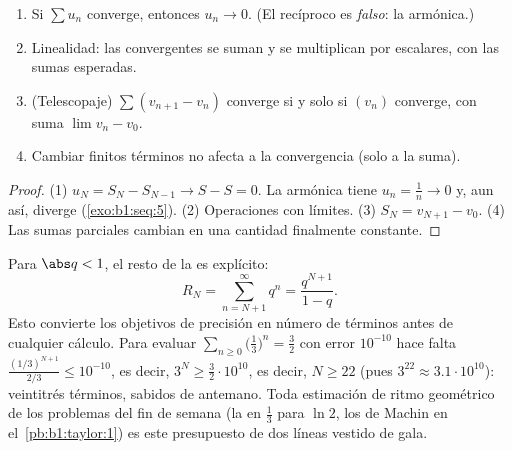 \begin{proposition}\label{prop:b1:series:first}
\begin{enumerate}
  \item Si $\sum u_n$ converge, entonces $u_n \to 0$. (El recíproco
        es \emph{falso}: la  armónica.)
  \item Linealidad: las  convergentes se suman y se
        multiplican por escalares, con las sumas esperadas.
  \item (Telescopaje) $\sum (v_{n+1} -
        v_n)$ converge si y solo si $(v_n)$ converge, con suma
        $\lim v_n - v_0$.
  \item Cambiar finitos términos no afecta a la convergencia (solo
        a la suma).
\end{enumerate}
\end{proposition}

\begin{proof}
(1) $u_N = S_N - S_{N-1} \to S - S = 0$. La  armónica tiene
$u_n = \frac1n \to 0$ y, aun así, diverge (\cref{exo:b1:seq:5}).
(2) Operaciones con límites. (3) $S_N = v_{N+1} - v_0$. (4) Las sumas
parciales cambian en una cantidad finalmente constante.
\end{proof}

\begin{example}\label{ex:b1:series:georemainder}
Para $\abs q < 1$, el resto de la  es explícito:
\[
R_N = \sum_{n = N+1}^{\infty} q^n = \frac{q^{N+1}}{1 - q} .
\]
Esto convierte los objetivos de precisión en número de términos antes
de cualquier cálculo. Para evaluar
$\sum_{n\geq0} \bigl(\frac13\bigr)^n = \frac32$ con error $10^{-10}$
hace falta $\frac{(1/3)^{N+1}}{2/3} \leq 10^{-10}$, es decir,
$3^{N} \geq \frac{3}{2}\cdot 10^{10}$, es decir, $N \geq 22$ (pues
$3^{22} \approx 3.1\cdot10^{10}$): veintitrés términos, sabidos de
antemano. Toda estimación de ritmo geométrico de los problemas del
fin de semana (la  en $\frac13$ para $\ln 2$, los
 de Machin en el~\cref{pb:b1:taylor:1}) es este
presupuesto de dos líneas vestido de gala.
\end{example}

